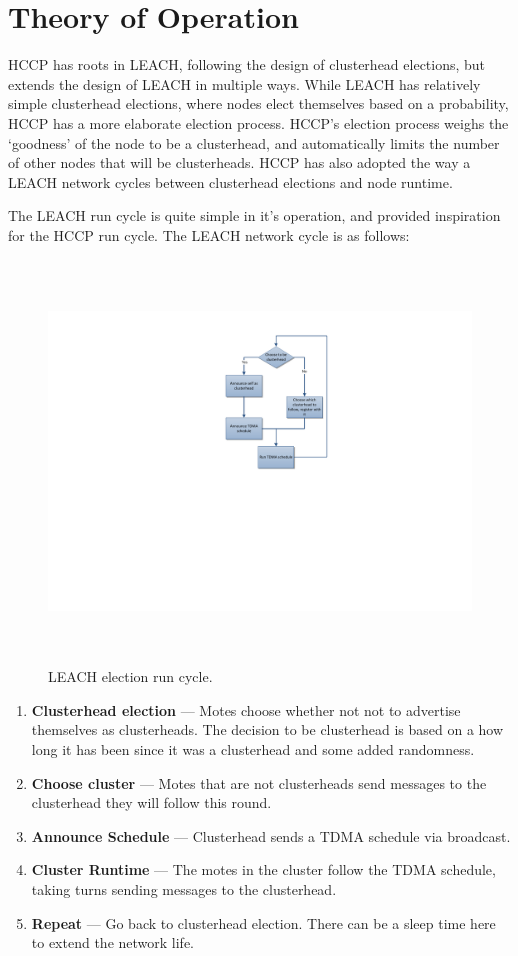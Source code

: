 \section{Theory of Operation}
\label{sec:theory}

HCCP has roots in LEACH, following the design of clusterhead elections, but extends the design of LEACH 
in multiple ways. While LEACH has relatively simple clusterhead elections, where nodes
elect themselves based on a probability, HCCP has a more elaborate election process. HCCP's election 
process weighs the `goodness' of the node to be a clusterhead, and automatically limits the number of other nodes that 
will be clusterheads. HCCP has also adopted the way a LEACH network cycles between clusterhead
elections and node runtime.

The LEACH run cycle is quite simple in it's operation, and provided inspiration for the HCCP
run cycle. The LEACH network cycle is as follows:

\begin{figure}[htbp]
	\centering
		\includegraphics[height=4.2in]{images/protocol/LeachFlowchart.pdf}
	\caption{LEACH election run cycle.}
	\label{fig:leachelec}
\end{figure}

\begin{enumerate}
	\item \textbf{Clusterhead election} --- Motes choose whether not not to advertise themselves as
	clusterheads. The decision to be clusterhead is based on a how long it has been since it was a 
	clusterhead and some added randomness.
	\item \textbf{Choose cluster} --- Motes that are not clusterheads send messages to the
	clusterhead they will follow this round.
	\item \textbf{Announce Schedule} --- Clusterhead sends a TDMA %
	schedule via broadcast. 
	\item \textbf{Cluster Runtime} --- The motes in the cluster follow the TDMA schedule, 
	taking turns sending messages to the clusterhead.
	\item \textbf{Repeat} --- Go back to clusterhead election. There can be a sleep time here to extend the network life.
\end{enumerate}



